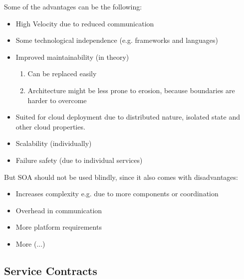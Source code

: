 \documentclass[../Main.tex]{subfiles}
\begin{document}
Some of the advantages can be the following:
\begin{itemize}
    \item High Velocity due to reduced communication
    \item Some technological independence (e.g. frameworks and languages)
    \item Improved maintainability (in theory)
    \begin{enumerate}
        \item Can be replaced easily
        \item Architecture might be less prone to erosion, because boundaries are harder to overcome
    \end{enumerate}
    \item Suited for cloud deployment due to distributed nature, isolated state and other cloud properties.
    \item Scalability (individually)
    \item Failure safety (due to individual services)
\end{itemize}
But SOA should not be used blindly, since it also comes with disadvantages:
\begin{itemize}
    \item Increases complexity e.g. due to more components or coordination
    \item Overhead in communication
    \item More platform requirements
    \item More (...)
\end{itemize}

\subsection{Service Contracts}
\end{document}

